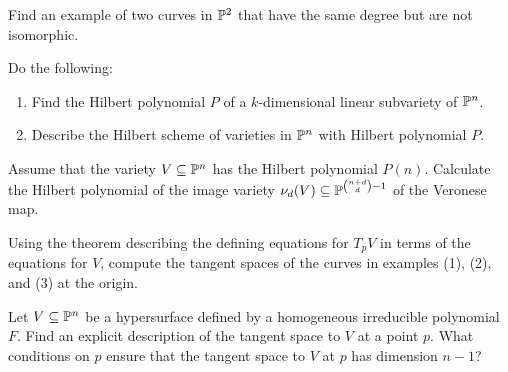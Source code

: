 \documentclass[12pt]{memoir}
\begin{document}
\begin{Ej}
	Find an example of two curves in $\mathbb{P}^2$ that have the same
	degree but are not isomorphic.
\end{Ej}

\begin{ptcbr}

\end{ptcbr}

\begin{Ej}
	Do the following:
	\begin{enumerate}
		\item Find the Hilbert polynomial $P$ of a $k$-dimensional linear
		      subvariety of $\mathbb{P}^n$.
		\item  Describe the Hilbert scheme of varieties in $\mathbb{P}^n$ with Hilbert
		      polynomial $P$.
	\end{enumerate}

\end{Ej}

\begin{ptcbr}

\end{ptcbr}

\begin{Ej}
	Assume that the variety $V\subseteq\mathbb{P}^n$ has the Hilbert polynomial
	$P(n)$. Calculate the Hilbert polynomial of the image variety $\nu_d(V)\subseteq \mathbb{P}^{\binom{n+d}{d}-1}$ of the Veronese map. 
\end{Ej}

\begin{ptcbr}

\end{ptcbr}

\begin{Ej}
	Using the theorem describing the defining equations for
	$T_pV$ in terms of the equations for $V$, compute the tangent spaces of the
	curves in examples (1), (2), and (3) at the origin.
\end{Ej}

\begin{ptcbr}

\end{ptcbr}
\begin{Ej}
	Let $V\subseteq\mathbb{P}^n$ be a hypersurface defined by a homogeneous
	irreducible polynomial $F$. Find an explicit description of the tangent space
	to $V$ at a point $p$. What conditions on $p$ ensure that the tangent space to
	$V$ at $p$ has dimension $n - 1$?
\end{Ej}

\begin{ptcbr}

\end{ptcbr}
\end{document}
